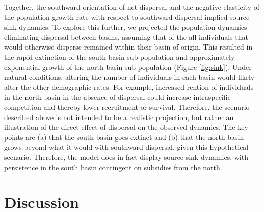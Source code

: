 \documentclass[11pt]{article}
\begin{document}
{Together, the southward orientation of net dispersal and the negative elasticity 
of the population growth rate with respect to southward dispersal implied source-sink dynamics. 
To explore this further, 
we projected the population dynamics eliminating dispersal between basins, 
assuming that of the all individuals that would otherwise disperse remained within
their basin of origin.
This resulted in the rapid extinction of the south basin sub-population
and approximately exponential growth 
of the north basin sub-population (Figure \ref{fig:sink}).
Under natural conditions, 
altering the number of individuals in each basin 
would likely alter the other demographic rates.
For example, increased rention of individuals in the north basin in the absence of dispersal
could increase intraspecific competition and thereby lower recruitment or survival.
Therefore, the scenario described above is not intended to be a realistic projection, 
but rather an illustration of the direct effect of dispersal on the observed dynamics.
The key points are 
(a) that the south basin goes extinct and 
(b) that the north basin grows beyond what it would with southward dispersal,
given this hypothetical scenario.
Therefore, the model does in fact display source-sink dynamics,
with persistence in the south basin contingent on subsidies from the north.








\section*{Discussion}

}
\end{document}
